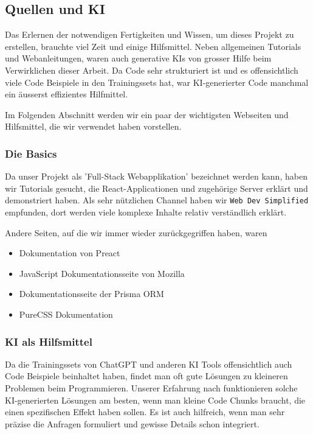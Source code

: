 \subsection{Quellen und KI}

Das Erlernen der notwendigen Fertigkeiten und Wissen, um dieses Projekt zu erstellen, brauchte viel Zeit und einige Hilfsmittel. Neben allgemeinen Tutorials und Webanleitungen, waren auch generative KIs von grosser Hilfe beim Verwirklichen dieser Arbeit. Da Code sehr strukturiert ist und es offensichtlich viele Code Beispiele in den Trainingssets hat, war KI-generierter Code manchmal ein äusserst effizientes Hilfmittel.

Im Folgenden Abschnitt werden wir ein paar der wichtigsten Webseiten und Hilfsmittel, die wir verwendet haben vorstellen.

\subsubsection{Die Basics} 
Da unser Projekt als 'Full-Stack Webapplikation' bezeichnet werden kann, haben wir Tutorials gesucht, die React-Applicationen und zugehörige Server erklärt und demonstriert haben. Als sehr nützlichen Channel haben wir \texttt{Web Dev Simplified} \cite{site:webdev} empfunden, dort werden viele komplexe Inhalte relativ verständlich erklärt.

Andere Seiten, auf die wir immer wieder zurückgegriffen haben, waren 
\begin{itemize}
    \item Dokumentation von Preact\cite{site:preact}
    \item JavaScript Dokumentationsseite von Mozilla\cite{site:js}
    \item Dokumentationsseite der Prisma ORM\cite{site:prisma}
    \item PureCSS Dokumentation\cite{site:pure}
\end{itemize}

\subsubsection{KI als Hilfsmittel}
Da die Trainingssets von ChatGPT und anderen KI Tools offensichtlich auch Code Beispiele beinhaltet haben, findet man oft gute Lösungen zu kleineren Problemen beim Programmieren. Unserer Erfahrung nach funktionieren solche KI-generierten Lösungen am besten, wenn man kleine Code Chunks braucht, die einen spezifischen Effekt haben sollen. Es ist auch hilfreich, wenn man sehr präzise die Anfragen formuliert und gewisse Details schon integriert.

